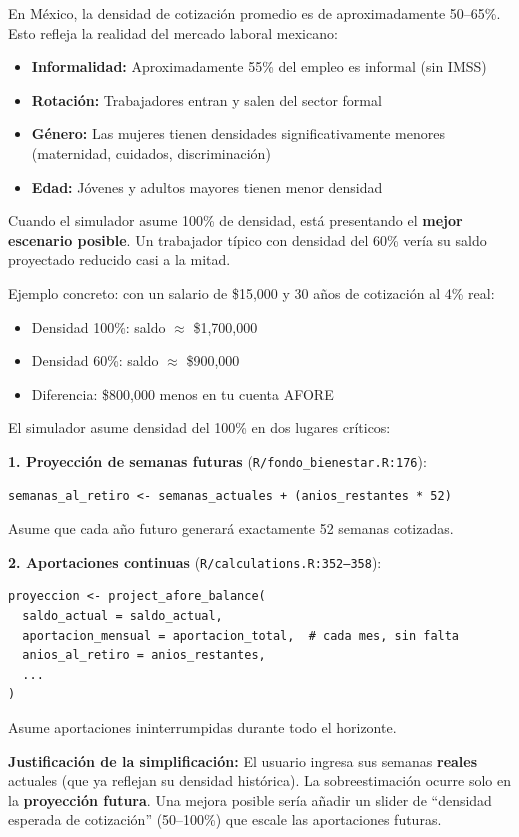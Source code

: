 \documentclass[11pt,a4paper]{report}
\begin{document}
\begin{tcolorbox}[colback=green!5!white, colframe=green!50!black, title=\textbf{Intuici\'on: La Informalidad Destruye Pensiones}]
En M\'exico, la densidad de cotizaci\'on promedio es de aproximadamente 50--65\%. Esto refleja la realidad del mercado laboral mexicano:
\begin{itemize}
  \item \textbf{Informalidad:} Aproximadamente 55\% del empleo es informal (sin IMSS)
  \item \textbf{Rotaci\'on:} Trabajadores entran y salen del sector formal
  \item \textbf{G\'enero:} Las mujeres tienen densidades significativamente menores (maternidad, cuidados, discriminaci\'on)
  \item \textbf{Edad:} J\'ovenes y adultos mayores tienen menor densidad
\end{itemize}

Cuando el simulador asume 100\% de densidad, est\'a presentando el \textbf{mejor escenario posible}. Un trabajador t\'ipico con densidad del 60\% ver\'ia su saldo proyectado reducido casi a la mitad.

Ejemplo concreto: con un salario de \$15,000 y 30 a\~nos de cotizaci\'on al 4\% real:
\begin{itemize}
  \item Densidad 100\%: saldo $\approx$ \$1,700,000
  \item Densidad 60\%: saldo $\approx$ \$900,000
  \item Diferencia: \$800,000 menos en tu cuenta AFORE
\end{itemize}
\end{tcolorbox}

\begin{tcolorbox}[colback=orange!5!white, colframe=orange!75!black, title=\textbf{Aplicaci\'on en C\'odigo: Densidad Fija al 100\%}]
El simulador asume densidad del 100\% en dos lugares cr\'iticos:

\textbf{1. Proyecci\'on de semanas futuras} (\texttt{R/fondo\_bienestar.R:176}):
\begin{lstlisting}
semanas_al_retiro <- semanas_actuales + (anios_restantes * 52)
\end{lstlisting}
Asume que cada a\~no futuro generar\'a exactamente 52 semanas cotizadas.

\textbf{2. Aportaciones continuas} (\texttt{R/calculations.R:352--358}):
\begin{lstlisting}
proyeccion <- project_afore_balance(
  saldo_actual = saldo_actual,
  aportacion_mensual = aportacion_total,  # cada mes, sin falta
  anios_al_retiro = anios_restantes,
  ...
)
\end{lstlisting}
Asume aportaciones ininterrumpidas durante todo el horizonte.

\textbf{Justificaci\'on de la simplificaci\'on:} El usuario ingresa sus semanas \textbf{reales} actuales (que ya reflejan su densidad hist\'orica). La sobreestimaci\'on ocurre solo en la \textbf{proyecci\'on futura}. Una mejora posible ser\'ia a\~nadir un slider de ``densidad esperada de cotizaci\'on'' (50--100\%) que escale las aportaciones futuras.
\end{tcolorbox}
\end{document}
